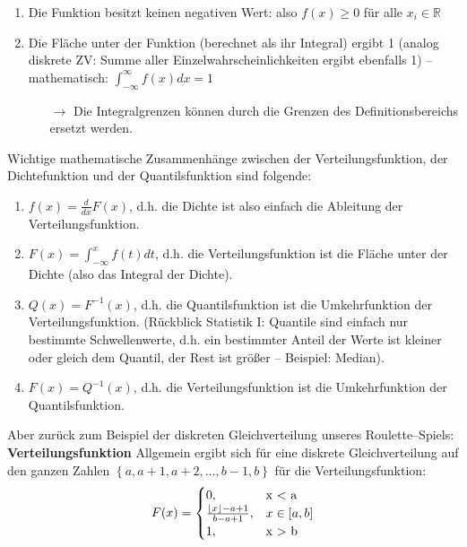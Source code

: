 \documentclass[a4paper]{article}
\DeclarePairedDelimiter\floor{\lfloor}{\rfloor}
\begin{document}
\newpage

\begin{enumerate}
    \item Die Funktion besitzt keinen negativen Wert: also $f(x)\geq 0$ für alle $x_i \in \mathbb{R}$
    \item Die Fläche unter der Funktion (berechnet als ihr Integral) ergibt 1 (analog diskrete ZV: Summe aller Einzelwahrscheinlichkeiten ergibt ebenfalls 1) -- mathematisch: $\int_{-\infty}^{\infty} f(x) dx = 1$
    \begin{itemize}
	\item[$\rightarrow$] Die Integralgrenzen können durch die Grenzen des Definitionsbereichs ersetzt werden.
	\end{itemize}
\end{enumerate}

\noindent Wichtige mathematische Zusammenhänge zwischen der Verteilungsfunktion, der Dichtefunktion und der Quantilsfunktion sind folgende:

\begin{enumerate}
    \item $f(x)= \frac{d}{dx} F(x)$, d.h. die Dichte ist also einfach die Ableitung der Verteilungsfunktion.
    \item $F(x)= \int_{-\infty}^{x} f(t)dt$, d.h. die Verteilungsfunktion ist die Fläche unter der Dichte (also das Integral der Dichte).
    \item $Q(x)= F^{-1}(x)$, d.h. die Quantilsfunktion ist die Umkehrfunktion der Verteilungsfunktion. (Rückblick Statistik I: Quantile sind einfach nur bestimmte Schwellenwerte, d.h. ein bestimmter Anteil der Werte ist kleiner oder gleich dem Quantil, der Rest ist größer -- Beispiel: Median).
    \item $F(x) = Q^{-1}(x)$, d.h. die Verteilungsfunktion ist die Umkehrfunktion der Quantilsfunktion.
\end{enumerate}

\noindent Aber zurück zum Beispiel der diskreten Gleichverteilung unseres Roulette--Spiels:\\

\noindent \textbf{Verteilungsfunktion}
Allgemein ergibt sich für eine diskrete Gleichverteilung auf den ganzen Zahlen 
$\left\{a,a+1,a+2,\ldots, b-1, b\right\}$ für die Verteilungsfunktion:
\begin{equation*}
    F(x)=\begin{cases}
			0, & \text{x < a}\\
            \frac{\floor*{x}-a+1}{b-a+1}, & \text{$x \in [a,b]$}\\
            1, & \text{x > b}
		 \end{cases}
\end{equation*}
\end{document}
